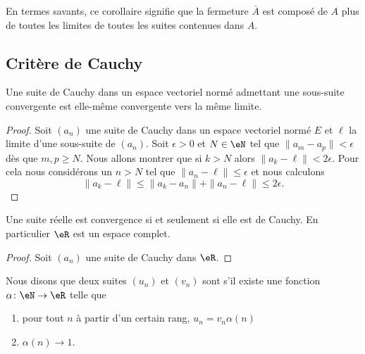 En termes savants, ce corollaire signifie que la fermeture $\bar A$ est composé de $A$ plus de toutes les limites de toutes les suites contenues dans $A$.

\subsection{Critère de Cauchy}


\begin{lemma}
    Une suite de Cauchy dans un espace vectoriel normé admettant une sous-suite convergente est elle-même convergente vers la même limite.
\end{lemma}

\begin{proof}
    Soit \( (a_n)\) une suite de Cauchy dans un espace vectoriel normé \( E\) et \( \ell\) la limite d'une sous-suite de \( (a_n)\). Soit \( \epsilon>0\) et \( N\in \eN\) tel que \( \| a_m-a_p \|<\epsilon\) dès que \( m,p\geq N\). Nous allons montrer que si \( k>N\) alors \( \| a_k-\ell \|<2\epsilon\). Pour cela nous considérons un \( n>N\) tel que \( \| a_n-\ell \|\leq \epsilon\) et nous calculons
    \begin{equation}
        \| a_k-\ell \|\leq \| a_k-a_n \|+\| a_n-\ell \|\leq 2\epsilon.
    \end{equation}
\end{proof}

\begin{theorem}  \label{ThoHGyzAva}
    Une suite réelle est convergence si et seulement si elle est de Cauchy. En particulier \( \eR\) est un espace complet.
\end{theorem}

\begin{proof}
    Soit \( (a_n)\) une suite de Cauchy dans \( \eR\).   
\end{proof}

\begin{definition}
    Nous disons que deux suites \( (u_n)\) et \( (v_n)\) sont  s'il existe une fonction \( \alpha\colon \eN\to \eR\) telle que
    \begin{enumerate}
        \item
            pour tout \( n\) à partir d'un certain rang, \( u_n=v_n\alpha(n)\)
        \item
            \( \alpha(n)\to 1\).
    \end{enumerate}
\end{definition}

